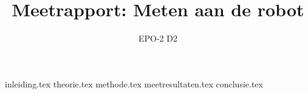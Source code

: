 \documentclass{report}
\title{Meetrapport: Meten aan de robot}
\author{EPO-2 D2}
\begin{document}
\maketitle
\newpage
{}
\tableofcontents
{inleiding.tex}
\newpage
{}
{theorie.tex}
{methode.tex}
{meetresultaten.tex}
{conclusie.tex}
\newpage
{}
\printbibliography
\end{document}
